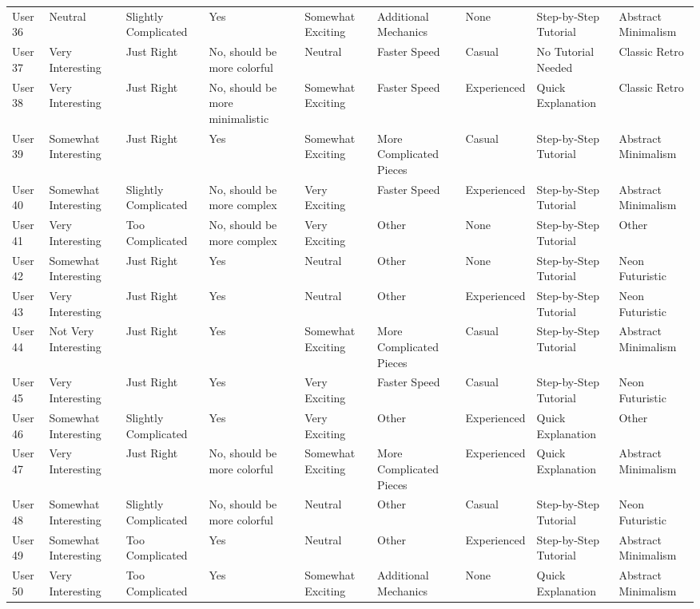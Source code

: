 \documentclass{article}
\begin{document}
\begin{landscape}
\begin{longtable}{lllllllll}
            User 36 & Neutral & Slightly Complicated & Yes & Somewhat Exciting & Additional Mechanics & None & Step-by-Step Tutorial & Abstract Minimalism \\
            User 37 & Very Interesting & Just Right & No, should be more colorful & Neutral & Faster Speed & Casual & No Tutorial Needed & Classic Retro \\
            User 38 & Very Interesting & Just Right & No, should be more minimalistic & Somewhat Exciting & Faster Speed & Experienced & Quick Explanation & Classic Retro \\
            User 39 & Somewhat Interesting & Just Right & Yes & Somewhat Exciting & More Complicated Pieces & Casual & Step-by-Step Tutorial & Abstract Minimalism \\
            User 40 & Somewhat Interesting & Slightly Complicated & No, should be more complex & Very Exciting & Faster Speed & Experienced & Step-by-Step Tutorial & Abstract Minimalism \\
            User 41 & Very Interesting & Too Complicated & No, should be more complex & Very Exciting & Other & None & Step-by-Step Tutorial & Other \\
            User 42 & Somewhat Interesting & Just Right & Yes & Neutral & Other & None & Step-by-Step Tutorial & Neon Futuristic \\
            User 43 & Very Interesting & Just Right & Yes & Neutral & Other & Experienced & Step-by-Step Tutorial & Neon Futuristic \\
            User 44 & Not Very Interesting & Just Right & Yes & Somewhat Exciting & More Complicated Pieces & Casual & Step-by-Step Tutorial & Abstract Minimalism \\
            User 45 & Very Interesting & Just Right & Yes & Very Exciting & Faster Speed & Casual & Step-by-Step Tutorial & Neon Futuristic \\
            User 46 & Somewhat Interesting & Slightly Complicated & Yes & Very Exciting & Other & Experienced & Quick Explanation & Other \\
            User 47 & Very Interesting & Just Right & No, should be more colorful & Somewhat Exciting & More Complicated Pieces & Experienced & Quick Explanation & Abstract Minimalism \\
            User 48 & Somewhat Interesting & Slightly Complicated & No, should be more colorful & Neutral & Other & Casual & Step-by-Step Tutorial & Neon Futuristic \\
            User 49 & Somewhat Interesting & Too Complicated & Yes & Neutral & Other & Experienced & Step-by-Step Tutorial & Abstract Minimalism \\
            User 50 & Very Interesting & Too Complicated & Yes & Somewhat Exciting & Additional Mechanics & None & Quick Explanation & Abstract Minimalism \\
            \bottomrule
            
        \end{longtable}
    \endgroup   
 \end{landscape}
\end{document}
